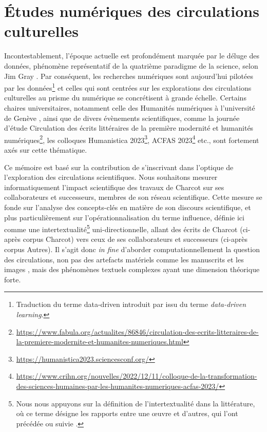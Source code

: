 \section{Études numériques des circulations culturelles}
Incontestablement, l'époque actuelle est profondément marquée par le \og{}déluge des données\fg{}, phénomène représentatif de la quatrième paradigme de la science, selon Jim Gray \citep[p.~30]{hey2009jim}. Par conséquent, les recherches numériques sont aujourd'hui \og{}pilotées par les données\fg{}\footnote{Traduction du terme \og{}data-driven\fg{} introduit par \citet{Johns1991ShouldYB} issu du terme \textit{data-driven learning}.} et celles qui sont centrées sur les explorations des circulations culturelles au prisme du numérique se concrétisent à grande échelle.
Certains chaires universitaires, notamment celle des Humanités numériques à l'université de Genève \citep{joyeux2022circulations}, ainsi que de divers évènements scientifiques, comme la journée d'étude \og{}Circulation des écrits littéraires de la première modernité et humanités numériques\fg{}\footnote{\url{https://www.fabula.org/actualites/86846/circulation-des-ecrits-litteraires-de-la-premiere-modernite-et-humanites-numeriques.html}}, les colloques Humanistica 2023\footnote{\url{https://humanistica2023.sciencesconf.org/}}, \textsc{ACFAS} 2023\footnote{\url{https://www.crihn.org/nouvelles/2022/12/11/colloque-de-la-transformation-des-sciences-humaines-par-les-humanites-numeriques-acfas-2023/}} etc., sont fortement axés sur cette thématique. 


Ce mémoire est basé sur la contribution de \citet{petkovic2023circulation} s'inscrivant dans l'optique de l'exploration des circulations scientifiques. Nous souhaitons mesurer informatiquement l'impact scientifique des travaux de Charcot sur ses collaborateurs et successeurs, membres de son réseau scientifique. Cette mesure se fonde sur l'analyse des concepts-clés en matière de son discours scientifique, et plus particulièrement sur l'opérationnalisation du terme \og{}influence\fg{}, définie ici comme une intertextualité\footnote{Nous nous appuyons sur la définition de l'intertextualité dans la littérature, où ce terme désigne les \og{}rapports entre une \oe{}uvre et d'autres, qui l'ont précédée ou suivie\fg{} \citep[p.~4]{riffaterre1980trace}.} uni-directionnelle, allant des écrits de Charcot (ci-après corpus \og{}Charcot\fg{}) vers ceux de ses collaborateurs et successeurs (ci-après corpus \og{}Autres\fg{}). Il s'agit donc \textit{in fine} d'aborder computationnellement la question des circulations, non pas des artefacts matériels comme les manuscrits \citep{gabay2021katabase} et les images \citep{joyeux2019visual}, mais des phénomènes textuels complexes \citep{manjavacas} ayant une dimension théorique forte. 


